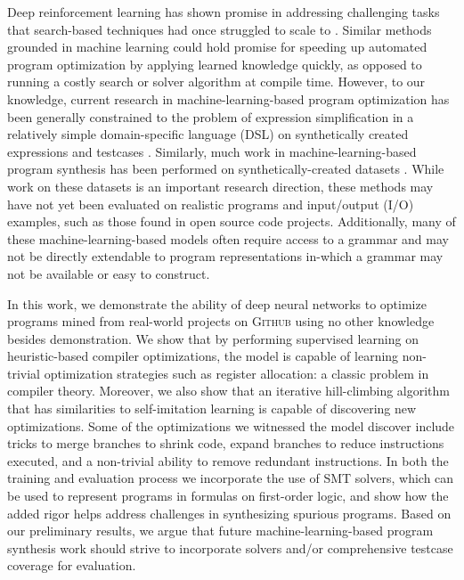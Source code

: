 \documentclass{article}
\begin{document}
Deep reinforcement learning has shown promise in addressing challenging tasks that search-based techniques had once struggled to scale to \cite{silver2017mastering}. Similar methods grounded in machine learning could hold promise for speeding up automated program optimization by applying learned knowledge quickly, as opposed to running a costly search or solver algorithm at compile time. However, to our knowledge, current research in machine-learning-based program optimization has been generally constrained to the problem of expression simplification in a relatively simple domain-specific language (DSL) on synthetically created expressions and testcases \cite{shi2020}. Similarly, much work in machine-learning-based program synthesis  has been performed on synthetically-created datasets \cite{parisotto2016neuro,bunel2018leveraging}. While work on these datasets is an important research direction, these methods may have not yet been evaluated on realistic programs and input/output (I/O) examples, such as those found in open source code projects. Additionally, many of these machine-learning-based models often require access to a grammar and may not be directly extendable to program representations in-which a grammar may not be available or easy to construct.

 

In this work, we demonstrate the ability of deep neural networks to optimize programs mined from real-world projects on \textsc{Github} using no other knowledge besides demonstration. We show that by performing supervised learning on heuristic-based compiler optimizations, the model is capable of learning non-trivial optimization strategies such as register allocation: a classic problem in compiler theory. Moreover, we also show that an iterative hill-climbing algorithm that has similarities to self-imitation learning \cite{oh2018self} is capable of discovering new optimizations. Some of the optimizations we witnessed the model discover include tricks to merge branches to shrink code, expand branches to reduce instructions executed, and a non-trivial ability to remove redundant instructions. In both the training and evaluation process we incorporate the use of SMT solvers, which can be used to represent programs in formulas on first-order logic, and show how the added rigor helps address challenges in synthesizing spurious programs. Based on our preliminary results, we argue that future machine-learning-based program synthesis work should strive to incorporate solvers and/or comprehensive testcase coverage for evaluation.   
\end{document}
